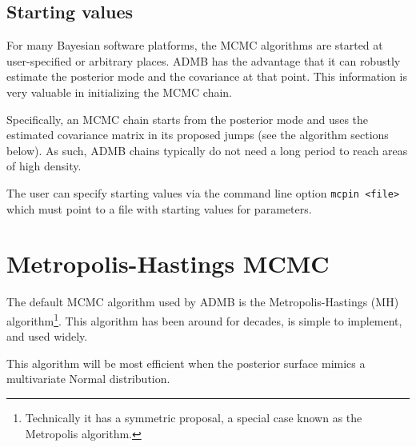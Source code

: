 \documentclass{article}\usepackage[]{graphicx}\usepackage[]{color}
\begin{document}

\subsection{Starting values}\label{sec:startvals}
For many Bayesian software platforms, the MCMC algorithms
are started at user-specified or arbitrary places. ADMB has the
advantage that it can robustly estimate the posterior mode
and the covariance at that point. This information is very
valuable in initializing the MCMC chain.

Specifically, an MCMC chain starts from the posterior mode
and uses the estimated covariance matrix in its proposed
jumps (see the algorithm sections below). As such, ADMB
chains typically do not need a long period to reach areas of
high density.

The user can specify starting values via the command line
option \texttt{mcpin <file>} which must point to a file with
starting values for parameters.

\section{Metropolis-Hastings MCMC}\label{sec:MH}
The default MCMC algorithm used by ADMB is the
Metropolis-Hastings (MH) algorithm\footnote{Technically it
  has a symmetric proposal, a special case known as the
  Metropolis algorithm.}. This algorithm has been around for
decades, is simple to implement, and used widely.

This algorithm will be most efficient when the posterior
surface mimics a multivariate Normal distribution.
\end{document}
